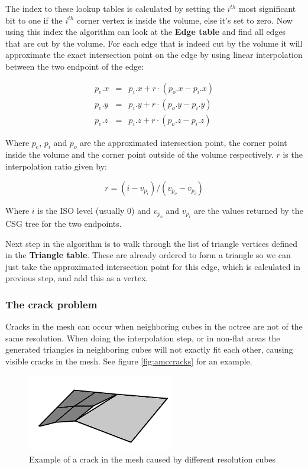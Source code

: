 \documentclass[a4paper,10pt,twocolumn]{article}
\begin{document}
The index to these lookup tables is calculated by setting the $i^{th}$ most significant bit to one if the $i^{th}$ corner vertex is inside the volume, else it's set to zero. Now using this index the algorithm can look at the \textbf{Edge table} and find all edges that are cut by the volume. For each edge that is indeed cut by the volume it will approximate the exact intersection point on the edge by using linear interpolation between the two endpoint of the edge:

\begin{eqnarray}
    p_e.x & = & p_i.x + r \cdot (p_o.x - p_i.x) \\
    p_e.y & = & p_i.y + r \cdot (p_o.y - p_i.y) \\
    p_e.z & = & p_i.z + r \cdot (p_o.z - p_i.z)
\end{eqnarray}

Where $p_e$, $p_i$ and $p_o$ are the approximated intersection point, the corner point inside the volume and the corner point outside of the volume respectively. $r$ is the interpolation ratio given by:

\begin{equation}
    r = (i - v_{p_i}) / (v_{p_o} - v_{p_i})
\end{equation}

Where $i$ is the ISO level (usually 0) and $v_{p_o}$ and $v_{p_i}$ are the values returned by the CSG tree for the two endpoints.

Next step in the algorithm is to walk through the list of triangle vertices defined in the \textbf{Triangle table}. These are already ordered to form a triangle so we can just take the approximated intersection point for this edge, which is calculated in previous step, and add this as a vertex.

\subsubsection{The crack problem}
\label{sect:crack_problem}

Cracks in the mesh can occur when neighboring cubes in the octree are not of the same resolution. When doing the interpolation step, or in non-flat areas the generated triangles in neighboring cubes will not exactly fit each other, causing visible cracks in the mesh. See figure \ref{fig:amccracks} for an example.

    \begin{figure}[h]
        \begin{center}
            \includegraphics[scale=0.8]{./images/amccrack}
        \end{center}
        \caption{Example of a crack in the mesh caused by different resolution cubes}
        \label{figure:amccracks}
    \end{figure}
\end{document}
